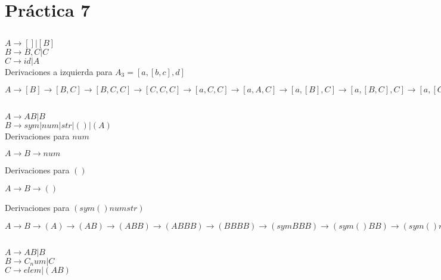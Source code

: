\setcounter{section}{6}
\section{Práctica 7}
\subsection{}
$A \longrightarrow [] | [B]$ \\
$B \longrightarrow B , C | C$ \\
$C \longrightarrow id | A$ \\	


Derivaciones a izquierda para $A_3 = [a , [b , c] , d]$

$A \longrightarrow [B] \longrightarrow [B, C] \longrightarrow [B , C , C] \longrightarrow [C , C , C] \longrightarrow [a , C , C] \longrightarrow [a , A , C] \longrightarrow [a , [B] , C] \longrightarrow [a, [B , C] , C] \longrightarrow [a , [C , C] , C] \longrightarrow [a , [b , C] , C] \longrightarrow [a , [b , c] , C] \longrightarrow [a , [b , c] , d]$

\subsection{}
$A \longrightarrow A B | B$ \\
$B \longrightarrow sym | num | str | () | (A)$ \\

Derivaciones para $num$

$A \longrightarrow B \longrightarrow num$

Derivaciones para $()$

$A \longrightarrow B \longrightarrow ()$

Derivaciones para $( sym () num str )$

$A \longrightarrow B \longrightarrow (A) \longrightarrow (A B) \longrightarrow (A B B) \longrightarrow (A B B B) \longrightarrow (B B B B) \longrightarrow (sym B B B) \longrightarrow (sym () B B) \longrightarrow (sym () num B) \longrightarrow (sym () num str)$

\subsection{}
$A \longrightarrow AB | B$ \\
$B \longrightarrow C_num | C$ \\
$C \longrightarrow elem | (AB)$ \\

